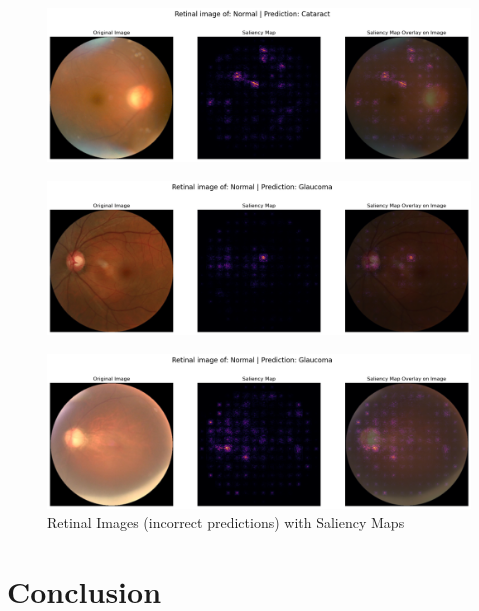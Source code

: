 \documentclass[sigconf]{acmart}
\begin{document}
\begin{figure}[]
  \centering
  \includegraphics[width=\linewidth]{samples/resources/saliency maps/Normal_as_cataracts.png}
\end{figure}
\begin{figure}[]
  \centering
  \includegraphics[width=\linewidth]{samples/resources/saliency maps/normal_as_glaucoma_1.png}
\end{figure}
\begin{figure}[]
  \centering
  \includegraphics[width=\linewidth]{samples/resources/saliency maps/normal_as_glaucoma_2.png}
  \caption{Retinal Images (incorrect predictions) with Saliency Maps}
\end{figure}

\section{Conclusion}
\end{document}
